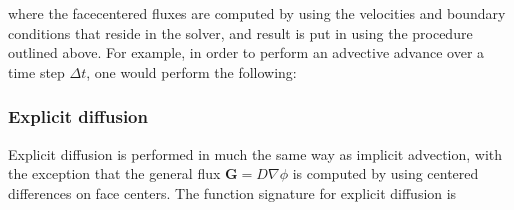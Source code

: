 \documentclass[letterpaper,10pt,english]{sphinxmanual}
\begin{document}
\begin{sphinxVerbatim}[commandchars=\\\{\},formatcom=\scriptsize]
        
\end{sphinxVerbatim}

where the face\sphinxhyphen{}centered fluxes are computed by using the velocities and boundary conditions that reside in the solver, and result is put in  using the procedure outlined above.
For example, in order to perform an advective advance over a time step \(\Delta t\), one would perform the following:

\begin{sphinxVerbatim}[commandchars=\\\{\},formatcom=\scriptsize]
   
          
\end{sphinxVerbatim}


\subsubsection{Explicit diffusion}
\label{\detokenize{CDR:explicit-diffusion}}\label{\detokenize{CDR:chap-explicitdiffusion}}
Explicit diffusion is performed in much the same way as implicit advection, with the exception that the general flux \(\mathbf{G} = D\nabla\phi\) is computed by using centered differences on face centers.
The function signature for explicit diffusion is

\begin{sphinxVerbatim}[commandchars=\\\{\},formatcom=\scriptsize]
     
\end{sphinxVerbatim}
\end{document}
